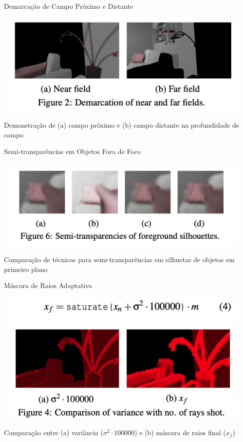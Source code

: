 \documentclass[aspectratio=169,xcolor=table]{beamer}
\begin{document}
\begin{frame}{Demarcação de Campo Próximo e Distante}
    \begin{center}
        \includegraphics[width=0.95\textwidth]{near-far-field}
    \end{center}
    \begin{center}
        \small{Demonstração de (a) campo próximo e (b) campo distante na profundidade de campo}
    \end{center}
\end{frame}

\begin{frame}{Semi-transparências em Objetos Fora de Foco}
    \begin{center}
        \includegraphics[width=0.95\textwidth]{semi-transparencias}
    \end{center}
    \begin{center}
        \small{Comparação de técnicas para semi-transparências em silhuetas de objetos em primeiro plano}
    \end{center}
\end{frame}

\begin{frame}{Máscara de Raios Adaptativa}
    \begin{center}
        \includegraphics[width=0.95\textwidth]{mascara-raios-adaptativos}
    \end{center}
    \begin{center}
        \small{Comparação entre (a) variância ($\sigma^2 \cdot 100000$) e (b) máscara de raios final ($x_f$)}
    \end{center}
\end{frame}
\end{document}
